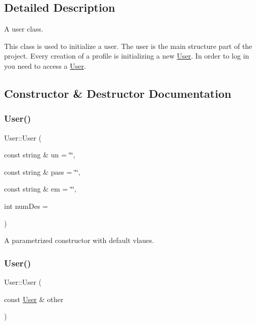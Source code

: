 \subsection{Detailed Description}
A user class. 

This class is used to initialize a user. The user is the main structure part of the project. Every creation of a profile is initializing a new \hyperlink{class_user}{User}. In order to log in you need to access a \hyperlink{class_user}{User}. 

\subsection{Constructor \& Destructor Documentation}
\mbox{\label{class_user_acefd113882ab5f80ea087401b7f9d0b4}} 
\subsubsection{\texorpdfstring{User()}{User()}\hspace{0.1cm}{\footnotesize\ttfamily [1/2]}}
{\footnotesize\ttfamily User\+::\+User (\begin{DoxyParamCaption}\item[{const string \&}]{un = {\ttfamily \char`\"{}\char`\"{}},  }\item[{const string \&}]{pass = {\ttfamily \char`\"{}\char`\"{}},  }\item[{const string \&}]{em = {\ttfamily \char`\"{}\char`\"{}},  }\item[{int}]{num\+Des = {} }\end{DoxyParamCaption})}

A parametrized constructor with default vlaues. \mbox{\label{class_user_aad23b10cdefd26d6ca2ca981e9f9c973}} 
\subsubsection{\texorpdfstring{User()}{User()}\hspace{0.1cm}{\footnotesize\ttfamily [2/2]}}
{\footnotesize\ttfamily User\+::\+User (\begin{DoxyParamCaption}\item[{const \hyperlink{class_user}{User} \&}]{other }\end{DoxyParamCaption})}

